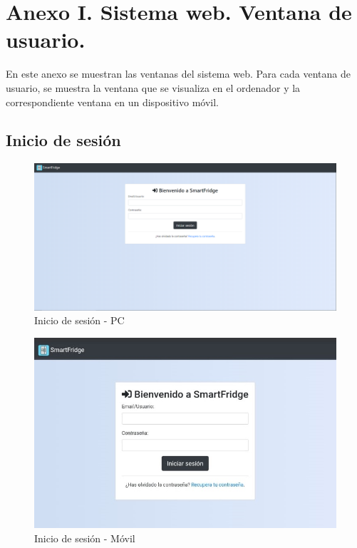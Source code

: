 \titleformat{\chapter}{\normalfont\huge\bfseries}{}{1em}{} 
\appendix
\chapter{Anexo I. Sistema web. Ventana de usuario.}
En este anexo se muestran las ventanas del sistema web. Para cada ventana de usuario, se muestra la ventana que se visualiza en el ordenador y la correspondiente ventana en un dispositivo móvil.

\newpage
\fancyhead{}
\fancyfoot{}
\renewcommand{\headrulewidth}{0.5pt}
\fancyhead[LE,RO]{\textsl{\thepage}}
\fancyhead[LO]{\textsl{\nombreTFG}}
\section{Inicio de sesión}
\begin{figure}[h] 
    \centering
    \includegraphics[width=.90\textwidth]{capitulos/anexotres/PC/Login.png}
    \caption{Inicio de sesión - PC}
    \label{fig:loginpc}
\end{figure}

\begin{figure}[h] 
    \centering
    \includegraphics[width=.50\textwidth]{capitulos/anexotres/Phone/Login.jpeg}
    \caption{Inicio de sesión - Móvil}
    \label{fig:loginphone}
\end{figure}

